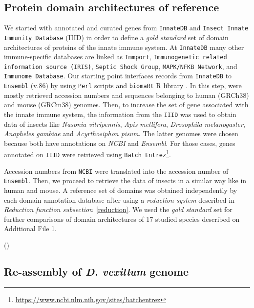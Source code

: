 \documentclass[11pt]{article}
\begin{document}
\subsection*{Protein domain architectures of reference}
We started with annotated and curated genes from \texttt{InnateDB} 
\cite{Breuer01012013} and \texttt{Insect Innate Immunity Database} (IIID) 
\cite{Brucker2012} in order to define a \textsl{gold standard} set of domain 
architectures of proteins of the innate immune system. At \texttt{InnateDB} many 
other immune-specific databases are linked as \texttt{Immport}, 
\texttt{Immunogenetic related information source (IRIS)}, \texttt{Septic Shock 
Group}, \texttt{MAPK/NFKB Network}, and \texttt{Immunome Database}. Our starting 
point interfaces records from \texttt{InnateDB} to \texttt{Ensembl} (v.86) 
by using \texttt{Perl} scripts and \texttt{biomaRt} R library 
\cite{Durinck:2009aa}. In this step, were mostly retrieved accession numbers 
and sequences belonging to human (GRCh38) and mouse (GRCm38) genomes. Then, to 
increase the set of gene associated with the innate immune system, the 
information from the \texttt{IIID} was used to obtain data of insects like 
\textsl{Nasonia vitripennis}, \textsl{Apis mellifera}, \textsl{Drosophila 
melanogaster}, \textsl{Anopheles gambiae} and \textsl{Acyrthosiphon pisum}. The 
latter genomes were chosen because both have annotations on \textsl{NCBI} and 
\textsl{Ensembl}. For those cases, genes annotated on \texttt{IIID} were retrieved using \texttt{Batch Entrez}\footnote{\url{https://www.ncbi.nlm.nih.gov/sites/batchentrez}}. 

Accession numbers from \texttt{NCBI} were translated into the accession number 
of \texttt{Ensembl}. Then, we proceed to retrieve the data of insects in a 
similar way like in human and mouse. A reference set of domains was obtained 
independently by each domain annotation database after using a \textsl{reduction 
system} described in \textsl{Reduction function subsection}~\ref{reduction}. We 
used the \textsl{gold standard} set for further comparisons of domain 
architectures of $17$ studied species described on Additional File 1.

\iffalse()
\subsection*{Re-assembly of \textit{D. vexillum} genome}
\end{document}
